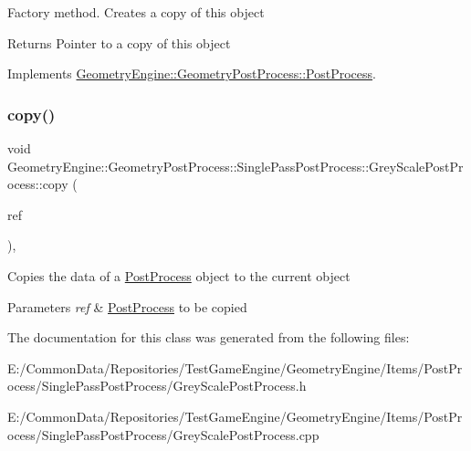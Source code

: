 Factory method. Creates a copy of this object \begin{DoxyReturn}{Returns}
Pointer to a copy of this object 
\end{DoxyReturn}


Implements \mbox{\hyperlink{class_geometry_engine_1_1_geometry_post_process_1_1_post_process_aa80749cf09041335f6b3bda3aaf31711}{Geometry\+Engine\+::\+Geometry\+Post\+Process\+::\+Post\+Process}}.

\mbox{\label{class_geometry_engine_1_1_geometry_post_process_1_1_single_pass_post_process_1_1_grey_scale_post_process_ae22e2bf8dc5b553a7b1526b695c8be88}} 
\subsubsection{\texorpdfstring{copy()}{copy()}}
{\footnotesize\ttfamily void Geometry\+Engine\+::\+Geometry\+Post\+Process\+::\+Single\+Pass\+Post\+Process\+::\+Grey\+Scale\+Post\+Process\+::copy (\begin{DoxyParamCaption}\item[{const \mbox{\hyperlink{class_geometry_engine_1_1_geometry_post_process_1_1_single_pass_post_process_1_1_grey_scale_post_process}{Grey\+Scale\+Post\+Process}} \&}]{ref }\end{DoxyParamCaption})\hspace{0.3cm}{\ttfamily [protected]}, {\ttfamily [virtual]}}

Copies the data of a \mbox{\hyperlink{class_geometry_engine_1_1_geometry_post_process_1_1_post_process}{Post\+Process}} object to the current object 
\begin{DoxyParams}{Parameters}
{\em ref} & \mbox{\hyperlink{class_geometry_engine_1_1_geometry_post_process_1_1_post_process}{Post\+Process}} to be copied \\
\hline
\end{DoxyParams}


The documentation for this class was generated from the following files\+:\begin{DoxyCompactItemize}
\item 
E\+:/\+Common\+Data/\+Repositories/\+Test\+Game\+Engine/\+Geometry\+Engine/\+Items/\+Post\+Process/\+Single\+Pass\+Post\+Process/Grey\+Scale\+Post\+Process.\+h\item 
E\+:/\+Common\+Data/\+Repositories/\+Test\+Game\+Engine/\+Geometry\+Engine/\+Items/\+Post\+Process/\+Single\+Pass\+Post\+Process/Grey\+Scale\+Post\+Process.\+cpp\end{DoxyCompactItemize}
